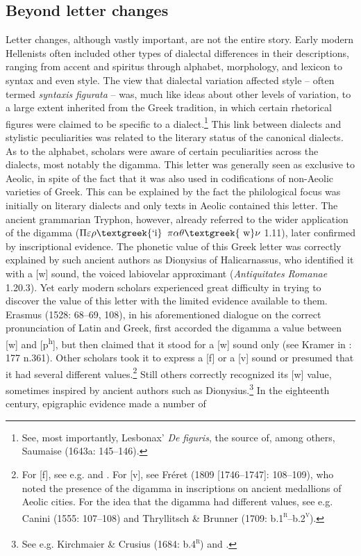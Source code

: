 \subsection{Beyond letter changes}
\hypertarget{Toc19704846}{}\begin{styleCatalogusnotities}
Letter changes, although vastly important, are not the entire story. Early modern Hellenists often included other types of dialectal differences in their descriptions, ranging from accent and spiritus through alphabet, morphology, and lexicon to syntax and even style. The view that dialectal variation affected style – often termed \textit{syntaxis} \textit{figurata} – was, much like ideas about other levels of variation, to a large extent inherited from the Greek tradition, in which certain rhetorical figures were claimed to be specific to a dialect.\footnote{ \textrm{See, most importantly, Lesbonax’} \textrm{\textit{De} \textit{figuris}}\textrm{, the source of, among others, Saumaise (1643a: 145–146).}} This link between dialects and stylistic peculiarities was related to the literary status of the canonical dialects. As to the alphabet, scholars were aware of certain peculiarities across the dialects, most notably the digamma. This letter was generally seen as exclusive to Aeolic, in spite of the fact that it was also used in codifications of non-Aeolic varieties of Greek. This can be explained by the fact the philological focus was initially on literary dialects and only texts in Aeolic contained this letter. The ancient grammarian Tryphon, however, already referred to the wider application of the digamma ($\Pi \varepsilon \rho \text{\textgreek{`i}}$ $\pi \alpha \theta \text{\textgreek{~w}}\nu $ 1.11), later confirmed by inscriptional evidence. The phonetic value of this Greek letter was correctly explained by such ancient authors as Dionysius of Halicarnassus, who identified it with a [w] sound, the voiced labiovelar approximant (\textit{Antiquitates} \textit{Romanae} 1.20.3). Yet early modern scholars experienced great difficulty in trying to discover the value of this letter with the limited evidence available to them. Erasmus (1528: 68–69, 108), in his aforementioned dialogue on the correct pronunciation of Latin and Greek, first accorded the digamma a value between [w] and [p\textsuperscript{h}], but then claimed that it stood for a [w] sound only (see Kramer in \citealt{Erasmus1978}: 177 n.361). Other scholars took it to express a [f] or a [v] sound or presumed that it had several different values.\footnote{ \textrm{For [f], see e.g. \citet[4]{Sylvius1531} and \citet[5]{Rhenius1626}. For [v], see Fréret (1809 [1746–1747]: 108–109), who noted the presence of the digamma in inscriptions on ancient medallions of Aeolic cities. For the idea that the digamma had different values, see e.g. Canini (1555: 107–108) and Thryllitsch \& Brunner (1709: b.1}\textrm{\textsc{\textsuperscript{r}}}\textrm{–b.2}\textrm{\textsc{\textsuperscript{v}}}).} Still others correctly recognized its [w] value, sometimes inspired by ancient authors such as Dionysius.\footnote{ \textrm{See e.g. Kirchmaier \& Crusius (1684: b.4}\textrm{\textsc{\textsuperscript{r}}}\textrm{) }\textrm{and \citet[19]{Reynolds1752}.}} In the eighteenth century, epigraphic evidence made a number of 
\end{styleCatalogusnotities}

